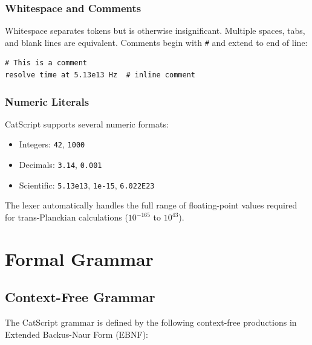 \documentclass[twocolumn,10pt]{article}
\begin{document}
\subsubsection{Whitespace and Comments}

Whitespace separates tokens but is otherwise insignificant. Multiple spaces, tabs, and blank lines are equivalent. Comments begin with \texttt{\#} and extend to end of line:

\begin{lstlisting}
# This is a comment
resolve time at 5.13e13 Hz  # inline comment
\end{lstlisting}

\subsubsection{Numeric Literals}

CatScript supports several numeric formats:
\begin{itemize}
    \item Integers: \texttt{42}, \texttt{1000}
    \item Decimals: \texttt{3.14}, \texttt{0.001}
    \item Scientific: \texttt{5.13e13}, \texttt{1e-15}, \texttt{6.022E23}
\end{itemize}

The lexer automatically handles the full range of floating-point values required for trans-Planckian calculations ($10^{-165}$ to $10^{43}$).

\section{Formal Grammar}
\label{sec:formal}

\subsection{Context-Free Grammar}

The CatScript grammar is defined by the following context-free productions in Extended Backus-Naur Form (EBNF):
\end{document}
